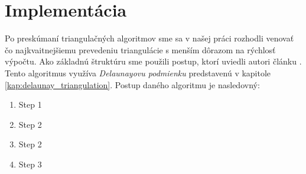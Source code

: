 \chapter{Implementácia}

Po preskúmaní triangulačných algoritmov sme sa v našej práci rozhodli venovať čo najkvaitnejšiemu
prevedeniu triangulácie s menším dôrazom na rýchlosť výpočtu. Ako základnú štruktúru sme použili 
postup, ktorí uviedli autori článku \cite{hilton1996marching}. Tento algoritmus využíva 
\textit{Delaunayovu podmienku} predstavenú v kapitole \ref{kap:delaunay_triangulation}.
Postup daného algoritmu je nasledovný:
\begin{enumerate}
    \item{Step 1}
    \item{Step 2}
    \item{Step 2}
    \item{Step 3}
\end{enumerate}